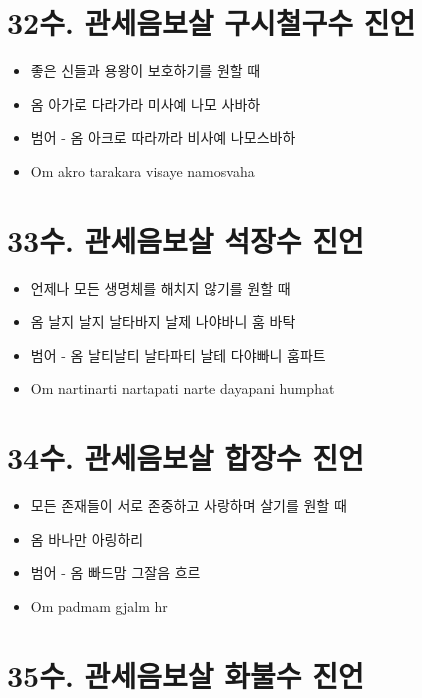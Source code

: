 \documentclass[12pt, a4paper, oneside]{book}
\let\stdsection\section
\renewcommand\section{\newpage\stdsection}
\begin{document}
\section{32수. 관세음보살 구시철구수 진언}

	 		\begin{itemize}
			\item 좋은 신들과 용왕이 보호하기를 원할 때
			\item 옴 아가로 다라가라 미사예 나모 사바하
			\item 범어 - 옴 아크로 따라까라 비사예 나모스바하
			\item Om akro tarakara visaye namosvaha
			\end{itemize}





\section{33수. 관세음보살 석장수 진언}

	 		\begin{itemize}
			\item 언제나 모든 생명체를 해치지 않기를 원할 때
			\item 옴 날지 날지 날타바지 날제 나야바니 훔 바탁
			\item 범어 - 옴 날티날티 날타파티 날테 다야빠니 훔파트
			\item Om nartinarti nartapati narte dayapani humphat
			\end{itemize}





\section{34수. 관세음보살 합장수 진언}

	 		\begin{itemize}
			\item 모든 존재들이 서로 존중하고 사랑하며 살기를 원할 때
			\item 옴 바나만 아링하리
			\item 범어 - 옴 빠드맘 그잘음 흐르
			\item Om padmam gjalm hr
			\end{itemize}





\section{35수. 관세음보살 화불수 진언}
\end{document}
